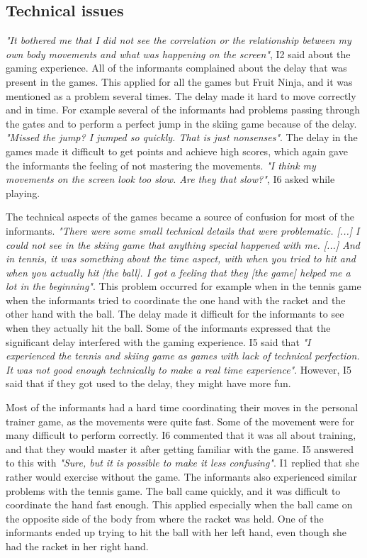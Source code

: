 \subsection{Technical issues}

\emph{"It bothered me that I did not see the correlation or the relationship between my own body movements and what was happening on the screen"}, I2 said about the gaming experience. All of the informants complained about the delay that was present in the games. This applied for all the games but Fruit Ninja, and it was mentioned as a problem several times. The delay made it hard to move correctly and in time. For example several of the informants had problems passing through the gates and to perform a perfect jump in the skiing game because of the delay. \emph{"Missed the jump? I jumped so quickly. That is just nonsenses"}. The delay in the games made it difficult to get points and achieve high scores, which again gave the informants the feeling of not mastering the movements. \emph{"I think my movements on the screen look too slow. Are they that slow?"}, I6 asked while playing. 

The technical aspects of the games became a source of confusion for most of the informants. \emph{"There were some small technical details that were problematic. [...] I could not see in the skiing game that anything special happened with me. [...] And in tennis, it was something about the time aspect, with when you tried to hit and when you actually hit [the ball]. I got a feeling that they [the game] helped me a lot in the beginning"}. This problem occurred for example when in the tennis game when the informants tried to coordinate the one hand with the racket and the other hand with the ball. The delay made it difficult for the informants to see when they actually hit the ball. Some of the informants expressed that the significant delay interfered with the gaming experience. I5 said that \emph{"I experienced the tennis and skiing game as games with lack of technical perfection. It was not good enough technically to make a real time experience"}. However, I5 said that if they got used to the delay, they might have more fun.

Most of the informants had a hard time coordinating their moves in the personal trainer game, as the movements were quite fast. Some of the movement were for many difficult to perform correctly. I6 commented that it was all about training, and that they would master it after getting familiar with the game. I5 answered to this with \emph{"Sure, but it is possible to make it less confusing"}. I1 replied that she rather would exercise without the game. The informants also experienced similar problems with the tennis game. The ball came quickly, and it was difficult to coordinate the hand fast enough. This applied especially when the ball came on the opposite side of the body from where the racket was held. One of the informants ended up trying to hit the ball with her left hand, even though she had the racket in her right hand. 

